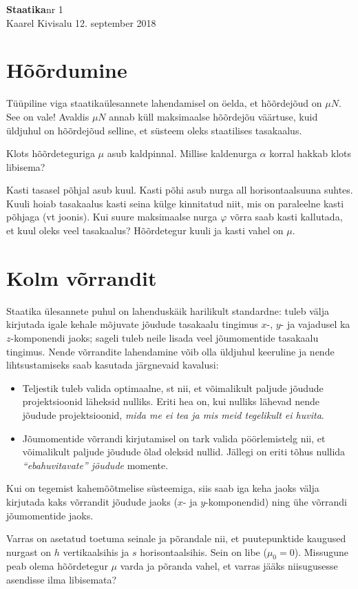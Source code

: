 \documentclass[a4paper,11pt,twocolumn]{article}
\begin{document}
{\huge \textbf{Staatika}\hfill \normalsize {nr 1}} \\
{Kaarel Kivisalu \hfill 12. september 2018}

\section{Hõõrdumine}
Tüüpiline viga staatikaülesannete lahendamisel on öelda, et hõõrdejõud on $\mu N$. See on vale! Avaldis $\mu N$ annab küll maksimaalse hõõrdejõu väärtuse, kuid üldjuhul on hõõrdejõud selline, et süsteem oleks staatilises tasakaalus.
\begin{question}
Klots hõõrdeteguriga $\mu$ asub kaldpinnal. Millise kaldenurga $\alpha$ korral hakkab klots libisema?
\end{question}
\begin{question}[Lahtine 2006, V7][sta1][5cm]
	Kasti tasasel põhjal asub kuul. Kasti põhi asub nurga all horisontaalsuuna suhtes. Kuuli hoiab tasakaalus kasti seina külge kinnitatud niit, mis on paraleelne kasti põhjaga (vt joonis). Kui suure maksimaalse nurga $ \varphi $ võrra saab kasti kallutada, et kuul oleks veel tasakaalus? Hõõrdetegur kuuli ja kasti vahel on $ \mu $.
\end{question}	

\section{Kolm võrrandit}
Staatika ülesannete puhul on lahenduskäik harilikult standardne: tuleb välja kirjutada igale kehale mõjuvate jõudude tasakaalu tingimus $x$-, $y$- ja vajadusel ka $z$-komponendi jaoks; sageli tuleb neile lisada veel jõumomentide tasakaalu tingimus. Nende võrrandite lahendamine  võib olla üldjuhul keeruline ja nende lihtsustamiseks saab kasutada järgnevaid kavalusi:
\begin{itemize}
	\item Teljestik tuleb valida optimaalne, st nii, et võimalikult paljude jõudude projektsioonid läheksid nulliks. Eriti hea on, kui nulliks lähevad nende jõudude projektsioonid, \textit{mida me ei tea ja mis meid tegelikult ei huvita}.
	\item Jõumomentide võrrandi kirjutamisel on tark valida pöörlemistelg nii, et võimalikult paljude jõudude õlad oleksid nullid. Jällegi on eriti tõhus nullida \textit{“ebahuvitavate” jõudude} momente.
\end{itemize}
Kui on tegemist kahemõõtmelise süsteemiga, siis saab iga keha jaoks välja kirjutada kaks võrrandit jõudude jaoks ($ x $- ja $ y $-komponendid) ning ühe võrrandi jõumomentide jaoks.
\begin{question}
	Varras on asetatud toetuma seinale ja põrandale nii, et puutepunktide kaugused nurgast on $h$ vertikaalsihis ja $s$ horisontaalsihis. Sein on libe ($\mu_0=0$). Missugune peab olema hõõrdetegur $\mu$ varda ja põranda vahel, et varras jääks niisugusesse asendisse ilma libisemata? 
\end{question}
\end{document}
